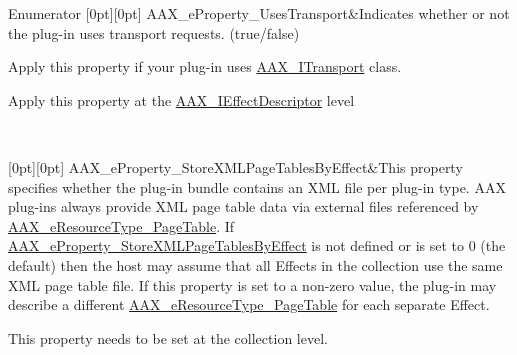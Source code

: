 \begin{DoxyEnumFields}{Enumerator}
[0pt][0pt]{}\mbox{\label{a00662_a13e384f22825afd3db6d68395b79ce0daf3e1162c5f517595589d513d48158dbd}} 
A\+A\+X\+\_\+e\+Property\+\_\+\+Uses\+Transport&Indicates whether or not the plug-\/in uses transport requests. ({\ttfamily true/{\ttfamily false})} \begin{DoxyItemize}
\item Apply this property if your plug-\/in uses \mbox{\hyperlink{a01885}{A\+A\+X\+\_\+\+I\+Transport}} class. \item Apply this property at the \mbox{\hyperlink{a01813}{A\+A\+X\+\_\+\+I\+Effect\+Descriptor}} level \end{DoxyItemize}
\\
\hline

[0pt][0pt]{}\mbox{\label{a00662_a13e384f22825afd3db6d68395b79ce0da1837e77c3a427004ac44714a8c9cbad9}} 
A\+A\+X\+\_\+e\+Property\+\_\+\+Store\+X\+M\+L\+Page\+Tables\+By\+Effect&This property specifies whether the plug-\/in bundle contains an X\+ML file per plug-\/in type. A\+AX plug-\/ins always provide X\+ML page table data via external files referenced by \mbox{\hyperlink{a00491_ae2805e88175d975589153a04e42898bbab0028d7fb45564dc4afa0f0a50296043}{A\+A\+X\+\_\+e\+Resource\+Type\+\_\+\+Page\+Table}}. If \mbox{\hyperlink{a00662_a13e384f22825afd3db6d68395b79ce0da1837e77c3a427004ac44714a8c9cbad9}{A\+A\+X\+\_\+e\+Property\+\_\+\+Store\+X\+M\+L\+Page\+Tables\+By\+Effect}} is not defined or is set to 0 (the default) then the host may assume that all Effects in the collection use the same X\+ML page table file. If this property is set to a non-\/zero value, the plug-\/in may describe a different \mbox{\hyperlink{a00491_ae2805e88175d975589153a04e42898bbab0028d7fb45564dc4afa0f0a50296043}{A\+A\+X\+\_\+e\+Resource\+Type\+\_\+\+Page\+Table}} for each separate Effect.

This property needs to be set at the collection level. \\
\hline


\end{DoxyEnumFields}
